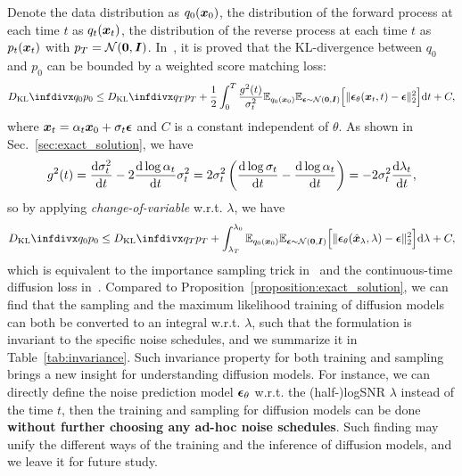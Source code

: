 Denote the data distribution as $q_0(\bm{x}_0)$, the distribution of the forward process at each time $t$ as $q_t(\bm{x}_t)$, the distribution of the reverse process at each time $t$ as $p_t(\bm{x}_t)$ with $p_T=\mathcal{N}(\bm{0},\bm{I})$. In~\citep{song2020score}, it is proved that the KL-divergence between $q_0$ and $p_0$ can be bounded by a weighted score matching loss:
\begin{equation}
    \kl{q_0}{p_0}\leq \kl{q_T}{p_T} + \frac{1}{2}\int_0^T \frac{g^2(t)}{\sigma_t^2}\E_{q_0(\x_0)}\E_{\epsilonv\sim\N(\vect{0},\Iv)}\Big[\|\epsilonv_\theta(\x_t,t)-\epsilonv\|_2^2\Big]\dt + C,
\end{equation}
where $\bm{x}_t=\alpha_t\bm{x}_0+\sigma_t\bm{\epsilon}$ and $C$ is a constant independent of $\theta$. As shown in Sec.~\ref{sec:exact_solution}, we have
\begin{equation}
\begin{aligned}
    g^2(t) = \frac{\dd\sigma_t^2}{\mathrm{d}t} - 2\frac{\dd\log\alpha_t}{\mathrm{d}t}\sigma_t^2
    = 2\sigma_t^2\left(\frac{\dd\log\sigma_t}{\mathrm{d}t} - \frac{\dd\log\alpha_t}{\mathrm{d}t}\right) = -2\sigma_t^2\frac{\dd\lambda_t}{\mathrm{d}t},
\end{aligned}
\end{equation}
so by applying \textit{change-of-variable} w.r.t. $\lambda$, we have
\begin{equation}
    \kl{q_0}{p_0}\leq \kl{q_T}{p_T} + \int_{\lambda_T}^{\lambda_0} \E_{q_0(\x_0)}\E_{\epsilonv\sim\N(\vect{0},\Iv)}\Big[\|\epsilonv_\theta(\hat\x_{\lambda},\lambda)-\epsilonv\|_2^2\Big]\dd\lambda + C,
\end{equation}
which is equivalent to the importance sampling trick in~\citep[Sec. 5.1]{song2021maximum} and the continuous-time diffusion loss in~\citep[Eq. (22)]{kingma2021variational}. Compared to Proposition~\ref{proposition:exact_solution}, we can find that the sampling and the maximum likelihood training of diffusion models can both be converted to an integral w.r.t. $\lambda$, such that the formulation is invariant to the specific noise schedules, and we summarize it in Table~\ref{tab:invariance}. Such invariance property for both training and sampling brings a new insight for understanding diffusion models. For instance, we can directly define the noise prediction model $\bm{\epsilon}_\theta$ w.r.t. the (half-)logSNR $\lambda$ instead of the time $t$, then the training and sampling for diffusion models can be done \textbf{without further choosing any ad-hoc noise schedules}. Such finding may unify the different ways of the training and the inference of diffusion models, and we leave it for future study.